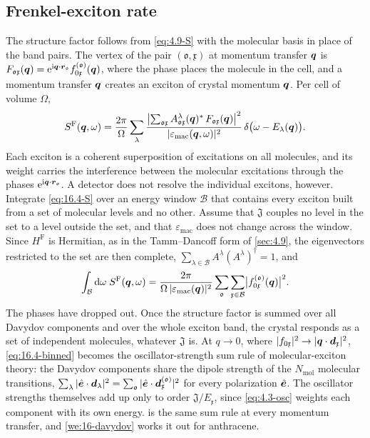\subsection{Frenkel-exciton rate}\label{sec:16.4-rate}

The structure factor follows from \cref{eq:4.9-S} with the molecular basis in place of the band pairs. The vertex of the pair $(\mathfrak{o},\mathfrak{x})$ at momentum transfer $\bm{q}$ is $F_{\mathfrak{o}\mathfrak{x}}(\bm{q}) = \mathrm{e}^{\mathrm{i}\bm{q}\cdot\bm{r}_{\mathfrak{o}}}f^{(\mathfrak{o})}_{0\mathfrak{x}}(\bm{q})$, where the phase places the molecule in the cell, and a momentum transfer $\bm{q}$ creates an exciton of crystal momentum $\bm{q}$. Per cell of volume $\Omega$,
\begin{equation}
  S^{\mathrm{F}}(\bm{q},\omega) = \frac{2\pi}{\Omega}\sum_\lambda\frac{\bigl|\sum_{\mathfrak{o}\mathfrak{x}}A^\lambda_{\mathfrak{o}\mathfrak{x}}(\bm{q})^*\,F_{\mathfrak{o}\mathfrak{x}}(\bm{q})\bigr|^2}{|\varepsilon_{\mathrm{mac}}(\bm{q},\omega)|^2}\,\delta\bigl(\omega - E_\lambda(\bm{q})\bigr) .
  \label{eq:16.4-S}
\end{equation}
Each exciton is a coherent superposition of excitations on all molecules, and its weight carries the interference between the molecular excitations through the phases $\mathrm{e}^{\mathrm{i}\bm{q}\cdot\bm{r}_{\mathfrak{o}}}$. A detector does not resolve the individual excitons, however. Integrate \cref{eq:16.4-S} over an energy window $\mathcal{B}$ that contains every exciton built from a set of molecular levels and no other. Assume that $\mathfrak{J}$ couples no level in the set to a level outside the set, and that $\varepsilon_{\mathrm{mac}}$ does not change across the window. Since $H^{\mathrm{F}}$ is Hermitian, as in the Tamm--Dancoff form of \cref{sec:4.9}, the eigenvectors restricted to the set are then complete, $\sum_{\lambda\in\mathcal{B}}A^\lambda(A^\lambda)^\dagger = 1$, and
\begin{equation}
  \int_{\mathcal{B}}\mathrm{d}\omega\;S^{\mathrm{F}}(\bm{q},\omega) = \frac{2\pi}{\Omega\,|\varepsilon_{\mathrm{mac}}(\bm{q})|^2}\sum_{\mathfrak{o}}\sum_{\mathfrak{x}\in\mathcal{B}}\bigl|f^{(\mathfrak{o})}_{0\mathfrak{x}}(\bm{q})\bigr|^2 .
  \label{eq:16.4-binned}
\end{equation}
The phases have dropped out. Once the structure factor is summed over all Davydov components and over the whole exciton band, the crystal responds as a set of independent molecules, whatever $\mathfrak{J}$ is. At $q \to 0$, where $|f_{0\mathfrak{x}}|^2 \to |\bm{q}\cdot\bm{d}_{\mathfrak{x}}|^2$, \cref{eq:16.4-binned} becomes the oscillator-strength sum rule of molecular-exciton theory: the Davydov components share the dipole strength of the $N_{\mathrm{mol}}$ molecular transitions, $\sum_{\lambda}|\hat{\bm{e}}\cdot\bm{d}_\lambda|^2 = \sum_{\mathfrak{o}}|\hat{\bm{e}}\cdot\bm{d}^{(\mathfrak{o})}_{\mathfrak{x}}|^2$ for every polarization $\hat{\bm{e}}$. The oscillator strengths themselves add up only to order $\mathfrak{J}/E_{\mathfrak{x}}$, since \cref{eq:4.3-osc} weights each component with its own energy.  is the same sum rule at every momentum transfer, and \cref{we:16-davydov} works it out for anthracene.

